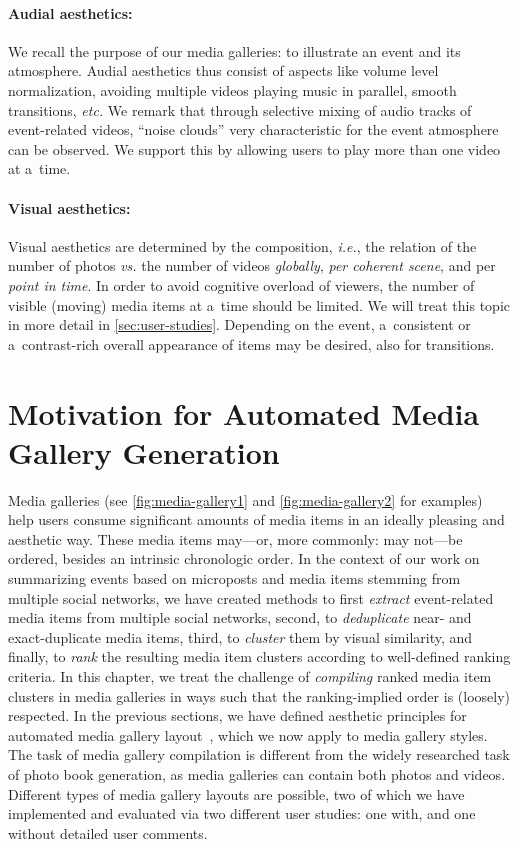 \paragraph{Audial aesthetics:}

We recall the purpose of our media galleries:
to illustrate an event and its atmosphere.
Audial aesthetics thus consist of aspects like volume level normalization,
avoiding multiple videos playing music in parallel, smooth transitions, \emph{etc.}
We remark that through selective mixing of audio tracks
of event-related videos, ``noise clouds'' very characteristic
for the event atmosphere can be observed.
We support this by allowing users to play more than one video at a~time.

\paragraph{Visual aesthetics:}

Visual aesthetics are determined by the composition, \emph{i.e.},
the relation of the number of photos \emph{vs.} the number of videos \emph{globally},
\emph{per coherent scene}, and per \emph{point in time}.
In order to avoid cognitive overload of viewers,
the number of visible (moving) media items
at a~time should be limited.
We will treat this topic in more detail in \autoref{sec:user-studies}.
Depending on the event, a~consistent or a~contrast-rich overall
appearance of items may be desired, also for transitions.

\section{Motivation for Automated Media Gallery Generation}
\label{sec:motivation-chapter-8}

Media galleries (see \autoref{fig:media-gallery1} and \autoref{fig:media-gallery2}
for examples)
help users consume significant
amounts of media items in an ideally pleasing and aesthetic way.
These media items may---or, more commonly: may not---be ordered,
besides an intrinsic chronologic order.
In the context of our work on summarizing events
based on microposts and media items stemming from
multiple social networks, we have created methods
to first \emph{extract} event-related media items
from multiple social networks, second, to
\emph{deduplicate} near- and exact-duplicate media items,
third, to \emph{cluster} them by visual similarity, and
finally, to \emph{rank} the resulting media item clusters
according to well-defined ranking criteria.
In this chapter, we treat the challenge of \emph{compiling}
ranked media item clusters in media galleries in ways
such that the ranking-implied order is (loosely) respected.
In the previous sections, we have defined
aesthetic principles for automated media gallery layout~\cite{steiner2012definingaesthetic},
which we now apply to media gallery styles.
The task of media gallery compilation is different
from the widely researched task of photo book generation,
as media galleries can contain both photos and videos.
Different types of media gallery layouts are possible,
two of which we have implemented and evaluated via two different user studies:
one with, and one without detailed user comments.

